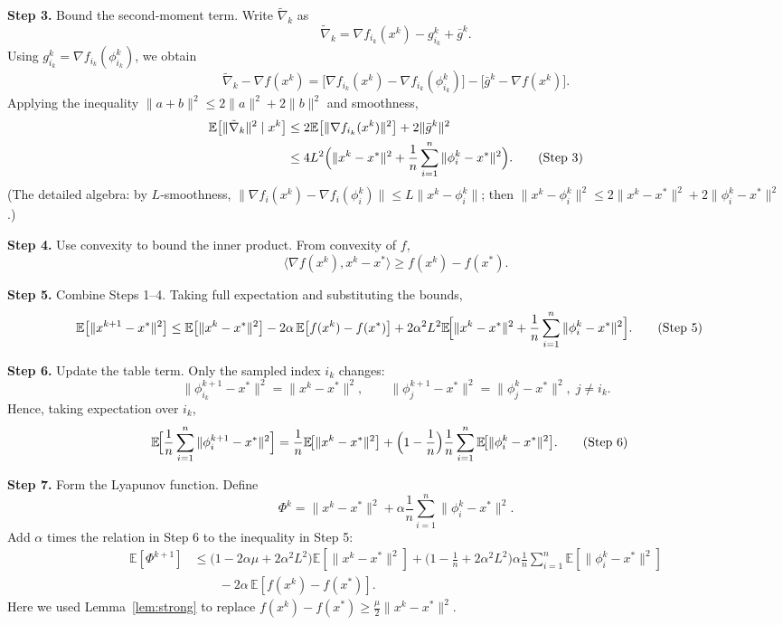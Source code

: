 \documentclass[11pt]{article}
\newcommand{\E}{\mathbb{E}}
\begin{document}
\noindent\textbf{Step 3.} Bound the second‑moment term.  
Write $\tilde{\nabla}_k$ as
\[
\tilde{\nabla}_k = \nabla f_{i_k}(x^{k})-g_{i_k}^{k}+\bar g^{k}.
\]
Using $g_{i_k}^{k}= \nabla f_{i_k}(\phi_{i_k}^{k})$, we obtain
\[
\tilde{\nabla}_k-\nabla f(x^{k}) = \bigl[\nabla f_{i_k}(x^{k})-\nabla f_{i_k}(\phi_{i_k}^{k})\bigr]
-\bigl[\bar g^{k}-\nabla f(x^{k})\bigr].
\]
Applying the inequality $\|a+b\|^{2}\le 2\|a\|^{2}+2\|b\|^{2}$ and smoothness,
\begin{align}
\E\bigl[\|\tilde{\nabla}_k\|^{2}\mid x^{k}\bigr]
&\le 2\E\bigl[\|\nabla f_{i_k}(x^{k})\|^{2}\bigr]+2\|\bar g^{k}\|^{2}\nonumber\\
&\le 4L^{2}\Bigl(\|x^{k}-x^{*}\|^{2}
+\frac{1}{n}\sum_{i=1}^{n}\|\phi_i^{k}-x^{*}\|^{2}\Bigr). \tag{Step 3}
\end{align}
(The detailed algebra: by $L$‑smoothness,
$\|\nabla f_i(x^{k})-\nabla f_i(\phi_i^{k})\|\le L\|x^{k}-\phi_i^{k}\|$;
then $\|x^{k}-\phi_i^{k}\|^{2}\le 2\|x^{k}-x^{*}\|^{2}+2\|\phi_i^{k}-x^{*}\|^{2}$.)

\noindent\textbf{Step 4.} Use convexity to bound the inner product.  
From convexity of $f$,
\[
\langle\nabla f(x^{k}),x^{k}-x^{*}\rangle\ge f(x^{k})-f(x^{*}). \tag{Step 4}
\]

\noindent\textbf{Step 5.} Combine Steps 1–4.  
Taking full expectation and substituting the bounds,
\begin{align}
\E\bigl[\|x^{k+1}-x^{*}\|^{2}\bigr]
&\le \E\bigl[\|x^{k}-x^{*}\|^{2}\bigr]
-2\alpha\,\E\bigl[f(x^{k})-f(x^{*})\bigr]
+2\alpha^{2}L^{2}\E\!\Bigl[\|x^{k}-x^{*}\|^{2}
+\frac{1}{n}\sum_{i=1}^{n}\|\phi_i^{k}-x^{*}\|^{2}\Bigr]. \tag{Step 5}
\end{align}

\noindent\textbf{Step 6.} Update the table term.  
Only the sampled index $i_k$ changes:
\[
\|\phi_{i_k}^{k+1}-x^{*}\|^{2}= \|x^{k}-x^{*}\|^{2},
\qquad
\|\phi_{j}^{k+1}-x^{*}\|^{2}= \|\phi_{j}^{k}-x^{*}\|^{2},\;j\neq i_k.
\]
Hence, taking expectation over $i_k$,
\begin{align}
\E\!\Bigl[\frac{1}{n}\sum_{i=1}^{n}\|\phi_i^{k+1}-x^{*}\|^{2}\Bigr]
&= \frac{1}{n}\E\!\bigl[\|x^{k}-x^{*}\|^{2}\bigr]
+ \Bigl(1-\frac{1}{n}\Bigr)\frac{1}{n}\sum_{i=1}^{n}\E\!\bigl[\|\phi_i^{k}-x^{*}\|^{2}\bigr]. \tag{Step 6}
\end{align}

\noindent\textbf{Step 7.} Form the Lyapunov function.  
Define
\[
\Phi^{k}= \|x^{k}-x^{*}\|^{2}+ \alpha\frac{1}{n}\sum_{i=1}^{n}\|\phi_i^{k}-x^{*}\|^{2}.
\]
Add $\alpha$ times the relation in Step 6 to the inequality in Step 5:
\begin{align}
\E[\Phi^{k+1}]
&\le \bigl(1-2\alpha\mu +2\alpha^{2}L^{2}\bigr)\E[\|x^{k}-x^{*}\|^{2}]
+ \bigl(1-\tfrac{1}{n}+2\alpha^{2}L^{2}\bigr)\alpha\frac{1}{n}\sum_{i=1}^{n}\E[\|\phi_i^{k}-x^{*}\|^{2}]\nonumber\\
&\qquad -2\alpha\,\E[f(x^{k})-f(x^{*})]. \tag{Step 7}
\end{align}
Here we used Lemma~\ref{lem:strong} to replace $f(x^{k})-f(x^{*})\ge \frac{\mu}{2}\|x^{k}-x^{*}\|^{2}$.
\end{document}
